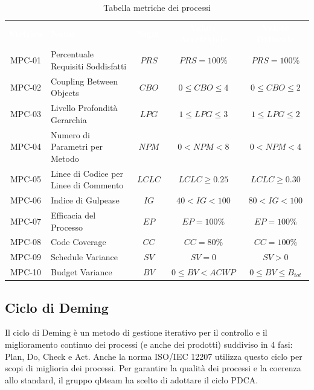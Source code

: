     \renewcommand{\arraystretch}{1.5}
    \begin{longtable}{ c C{4cm} c c c}
    \caption{Tabella metriche dei processi}\\
    \textcolor{white}{\textbf{Metrica}} & \textcolor{white}{\textbf{Nome}} & \textcolor{white}{\textbf{Sigla}} & \textcolor{white}{\textbf{Valore Accettabile}} & \textcolor{white}{\textbf{Valore Ottimale}}\\
    MPC-01 & Percentuale Requisiti Soddisfatti & $PRS$ & $PRS = 100\%$ & $PRS = 100\%$ \\
    MPC-02 & Coupling Between Objects & $CBO$ & $0 \leq CBO \leq 4$ & $0 \leq CBO \leq 2$ \\
    MPC-03 & Livello Profondità Gerarchia & $LPG$ &  $1 \leq LPG \leq 3$ &  $1 \leq LPG \leq 2$ \\
    MPC-04 & Numero di Parametri per Metodo & $NPM$ & $0 < NPM < 8$ & $ 0 < NPM < 4$ \\
    MPC-05 & Linee di Codice per Linee di Commento & $LCLC$ & $LCLC \geq 0.25$ & $LCLC \geq 0.30$ \\
    MPC-06 & Indice di Gulpease & $IG$ & $40 < IG < 100$ & $80 < IG < 100$ \\
    MPC-07 & Efficacia del Processo & $EP$ & $EP = 100\%$ & $EP = 100\%$ \\
    MPC-08 & Code Coverage & $CC$ & $CC = 80\%$ & $CC = 100\%$  \\
    MPC-09 & Schedule Variance & $SV$ & $SV = 0$ & $SV > 0$  \\	
    MPC-10 & Budget Variance & $BV$ & $0 \leq BV < ACWP$ & $0 \leq BV \leq B_{tot}$  \\
    \end{longtable}

\subsection{Ciclo di Deming}
Il ciclo di Deming è un metodo di gestione iterativo per il controllo e il miglioramento continuo dei processi (e anche dei prodotti) suddiviso in 4 fasi: Plan, Do, Check e Act. 
Anche la norma ISO/IEC 12207 utilizza questo ciclo per scopi di miglioria dei processi. Per garantire la qualità dei processi e la coerenza allo standard, il gruppo qbteam 
ha scelto di adottare il ciclo PDCA.

